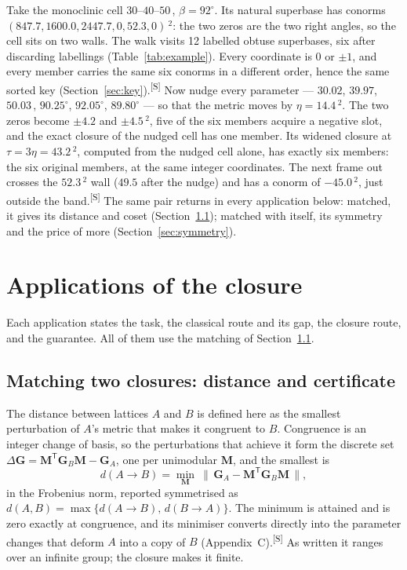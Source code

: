 \documentclass[preprint,pdf]{iucr}          %
\makeatletter
\newcommand{\Ang}{\text{\AA}}
\newcommand{\Gmet}{\mathbf{G}}
\newcommand{\Mop}{\mathbf{M}}
\newcommand{\chk}[1]{\textsuperscript{[S\@nameuse{zn@#1}]}}
\makeatother
\begin{document}
Take the monoclinic cell $30$--$40$--$50$\,\Ang, $\beta=92^\circ$. Its natural superbase has conorms $(847.7, 1600.0, 2447.7, 0, 52.3, 0)$\,\Ang$^2$: the two zeros are the two right angles, so the cell sits on two walls. The walk visits 12 labelled obtuse superbases, six after discarding labellings (Table~\ref{tab:example}). Every coordinate is $0$ or $\pm1$, and every member carries the same six conorms in a different order, hence the same sorted key (Section~\ref{sec:key}).\chk{z:transport} Now nudge every parameter --- $30.02$, $39.97$, $50.03$\,\Ang, $90.25^\circ$, $92.05^\circ$, $89.80^\circ$ --- so that the metric moves by $\eta=14.4$\,\Ang$^2$. The two zeros become $\pm4.2$ and $\pm4.5$\,\Ang$^2$, five of the six members acquire a negative slot, and the exact closure of the nudged cell has one member. Its widened closure at $\tau=3\eta=43.2$\,\Ang$^2$, computed from the nudged cell alone, has exactly six members: the six original members, at the same integer coordinates. The next frame out crosses the $52.3$\,\Ang$^2$ wall ($49.5$ after the nudge) and has a conorm of $-45.0$\,\Ang$^2$, just outside the band.\chk{z:transport} The same pair returns in every application below: matched, it gives its distance and coset (Section~\ref{sec:match}); matched with itself, its symmetry and the price of more (Section~\ref{sec:symmetry}).

\section{Applications of the closure}
\label{sec:apps}

Each application states the task, the classical route and its gap, the closure route, and the guarantee. All of them use the matching of Section~\ref{sec:match}.

\subsection{Matching two closures: distance and certificate}
\label{sec:match}
\label{sec:ideal}

The distance between lattices $A$ and $B$ is defined here as the smallest perturbation of $A$'s metric that makes it congruent to $B$. Congruence is an integer change of basis, so the perturbations that achieve it form the discrete set $\Delta\Gmet=\Mop^{\mathsf T}\Gmet_B\Mop-\Gmet_A$, one per unimodular $\Mop$, and the smallest is
\begin{equation}
d(A\!\to\!B)=\min_{\Mop}\ \big\|\,\Gmet_A-\Mop^{\mathsf T}\Gmet_B\Mop\,\big\|,
\label{eq:ideal}
\end{equation}
in the Frobenius norm, reported symmetrised as $d(A,B)=\max\{d(A\!\to\!B),\,d(B\!\to\!A)\}$. The minimum is attained and is zero exactly at congruence, and its minimiser converts directly into the parameter changes that deform $A$ into a copy of $B$ (Appendix~C).\chk{z:deformation} As written it ranges over an infinite group; the closure makes it finite.
\end{document}
